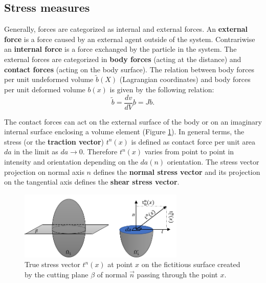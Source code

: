 \subsection{Stress measures}\label{subsection:stressmeasure}

Generally, forces are categorized as internal and external forces. An \textbf{external force } is a force caused by an external agent outside of the system. Contrariwise an \textbf{internal force} is a force exchanged by the particle in the system. The external forces are categorized in \textbf{body forces} (acting at the distance) and \textbf{contact forces} (acting on the body surface). The relation between body forces per unit undeformed volume $\tilde{b}(X)$ (Lagrangian coordinates) and body forces per unit deformed volume $b(x)$ is given by the following relation:
\begin{equation}
\tilde{b} = \frac{dv}{dV} b = Jb.
\end{equation}

The contact forces can act on the external surface of the body or on an imaginary internal surface enclosing a volume element (Figure \ref{internalcontactForceDefinition}). 
In general terms, the stress (or the \textbf{traction vector}) $t^n(x)$ is defined as contact force per unit area $da$ in the limit as $da \rightarrow 0$. Therefore $t^n(x)$ varies from point to point in intensity and orientation depending on the $da(n)$ orientation.  The stress vector projection on normal axis $n$ defines the \textbf{normal stress vector} and its projection on the tangential axis defines the \textbf{shear stress vector}.


\begin{figure}
\begin{center}
\includegraphics[width=0.7\textwidth,keepaspectratio]{figures/internalcontactForceDefinition.png} 
\caption[]{True stress vector $t^n(x)$ at point $x$ on the fictitious surface created  by the cutting plane $\beta$ of normal  $\overrightarrow n$ passing through the point $x$. }
\label{internalcontactForceDefinition}
\end{center}
\end{figure}

